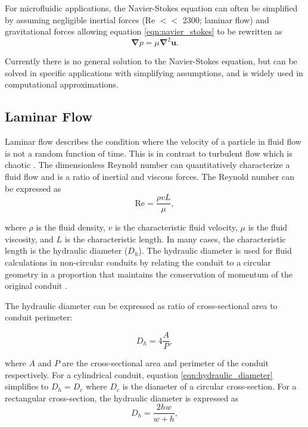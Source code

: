 \noindent For microfluidic applications, the Navier-Stokes equation can often be simplified by assuming negligible inertial forces (Re $<<$ 2300; laminar flow) and gravitational forces allowing equation \ref{eqn:navier_stokes} to be rewritten as
\begin{equation}
        \boldsymbol{\nabla}p = \mu\boldsymbol{\nabla}^2\textbf{u}.
\end{equation}

\par Currently there is no general solution to the Navier-Stokes equation, but can be solved in specific applications with simplifying assumptions, and is widely used in computational approximations.

\subsection*{Laminar Flow}
\par Laminar flow describes the condition where the velocity of a particle in fluid flow is not a random function of time. This is in contrast to turbulent flow which is chaotic \cite{david_j._beebe_physics_2002}. The dimensionless Reynold number can quantitatively characterize a fluid flow and is a ratio of inertial and viscous forces. The Reynold number can be expressed as
\begin{equation}
    \text{Re} = \frac{\rho v L}{\mu},
\end{equation}

\noindent where $\rho$ is the fluid density, $v$ is the characteristic fluid velocity, $\mu$ is the fluid viscosity, and $L$ is the characteristic length. In many cases, the characteristic length is the hydraulic diameter ($D_h$). The hydraulic diameter is used for fluid calculations in non-circular conduits by relating the conduit to a circular geometry in a proportion that maintains the conservation of momentum of the original conduit \cite{david_j._beebe_physics_2002}.

\par The hydraulic diameter can be expressed as ratio of cross-sectional area to conduit perimeter:

\begin{equation}
    D_h = 4 \frac{A}{P},
    \label{eqn:hydraulic_diameter}
\end{equation}

\noindent where $A$ and $P$ are the cross-sectional area and perimeter of the conduit respectively. For a cylindrical conduit, equation \ref{eqn:hydraulic_diameter} simplifies to $D_h = D_c$ where $D_c$ is the diameter of a circular cross-section. For a rectangular cross-section, the hydraulic diameter is expressed as 
\begin{equation}
    D_h = \frac{2hw}{w+h},
\end{equation}

